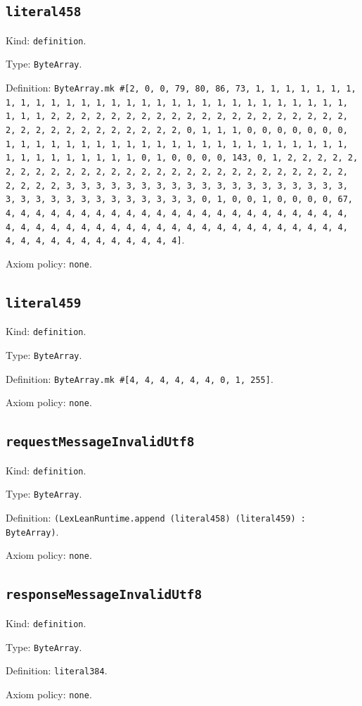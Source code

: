 \documentclass[11pt]{article}
\begin{document}
\subsection*{\texttt{literal458}}
\noindent Kind: \texttt{definition}.\par
\noindent Type: \texttt{ByteArray}.\par
\noindent Definition: \texttt{ByteArray.mk \#[2, 0, 0, 79, 80, 86, 73, 1, 1, 1, 1, 1, 1, 1, 1, 1, 1, 1, 1, 1, 1, 1, 1, 1, 1, 1, 1, 1, 1, 1, 1, 1, 1, 1, 1, 1, 1, 1, 1, 1, 2, 2, 2, 2, 2, 2, 2, 2, 2, 2, 2, 2, 2, 2, 2, 2, 2, 2, 2, 2, 2, 2, 2, 2, 2, 2, 2, 2, 2, 2, 2, 2, 0, 1, 1, 1, 0, 0, 0, 0, 0, 0, 0, 1, 1, 1, 1, 1, 1, 1, 1, 1, 1, 1, 1, 1, 1, 1, 1, 1, 1, 1, 1, 1, 1, 1, 1, 1, 1, 1, 1, 1, 1, 1, 1, 0, 1, 0, 0, 0, 0, 143, 0, 1, 2, 2, 2, 2, 2, 2, 2, 2, 2, 2, 2, 2, 2, 2, 2, 2, 2, 2, 2, 2, 2, 2, 2, 2, 2, 2, 2, 2, 2, 2, 2, 2, 3, 3, 3, 3, 3, 3, 3, 3, 3, 3, 3, 3, 3, 3, 3, 3, 3, 3, 3, 3, 3, 3, 3, 3, 3, 3, 3, 3, 3, 3, 3, 3, 0, 1, 0, 0, 1, 0, 0, 0, 0, 67, 4, 4, 4, 4, 4, 4, 4, 4, 4, 4, 4, 4, 4, 4, 4, 4, 4, 4, 4, 4, 4, 4, 4, 4, 4, 4, 4, 4, 4, 4, 4, 4, 4, 4, 4, 4, 4, 4, 4, 4, 4, 4, 4, 4, 4, 4, 4, 4, 4, 4, 4, 4, 4, 4, 4, 4, 4, 4]}.\par
\noindent Axiom policy: \texttt{none}.\par
\subsection*{\texttt{literal459}}
\noindent Kind: \texttt{definition}.\par
\noindent Type: \texttt{ByteArray}.\par
\noindent Definition: \texttt{ByteArray.mk \#[4, 4, 4, 4, 4, 4, 0, 1, 255]}.\par
\noindent Axiom policy: \texttt{none}.\par
\subsection*{\texttt{requestMessageInvalidUtf8}}
\noindent Kind: \texttt{definition}.\par
\noindent Type: \texttt{ByteArray}.\par
\noindent Definition: \texttt{(LexLeanRuntime.append (literal458) (literal459) : ByteArray)}.\par
\noindent Axiom policy: \texttt{none}.\par
\subsection*{\texttt{responseMessageInvalidUtf8}}
\noindent Kind: \texttt{definition}.\par
\noindent Type: \texttt{ByteArray}.\par
\noindent Definition: \texttt{literal384}.\par
\noindent Axiom policy: \texttt{none}.\par
\end{document}
